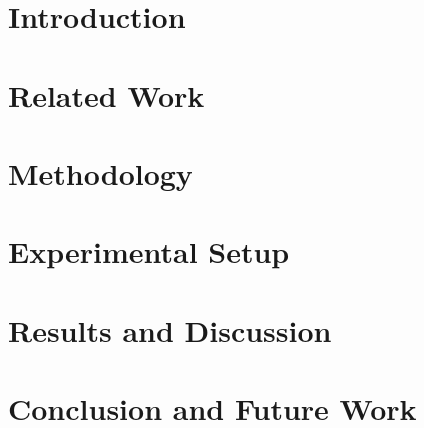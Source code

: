 \documentclass[sigconf]{acmart}
\begin{document}
\title{}



\renewcommand{\shortauthors}{Trovato et al.}

\begin{abstract}

\end{abstract}



\keywords{}

\maketitle

\section{Introduction}


\section{Related Work}


\section{Methodology}


\section{Experimental Setup}


\section{Results and Discussion}


\section{Conclusion and Future Work}


\begin{acks}

\end{acks}



\end{document}
